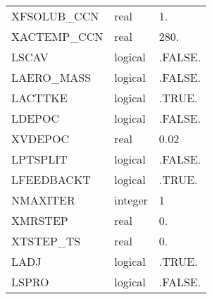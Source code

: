 \begin{longtable} {|p{}|p{}|p{}|}
XFSOLUB\_CCN & real & 1.  \\
XACTEMP\_CCN & real  & 280. \\
LSCAV & logical  & .FALSE.  \\
LAERO\_MASS & logical  & .FALSE.  \\
LACTTKE & logical  & .TRUE.  \\
LDEPOC & logical  & .FALSE.  \\
XVDEPOC &real& 0.02 \\
LPTSPLIT & logical  & .FALSE.  \\
LFEEDBACKT & logical  & .TRUE.  \\
NMAXITER & integer & 1 \\
XMRSTEP&real& 0. \\
XTSTEP\_TS& real&0.\\
LADJ & logical &  .TRUE. \\
LSPRO & logical & .FALSE. \\
\end{longtable}

